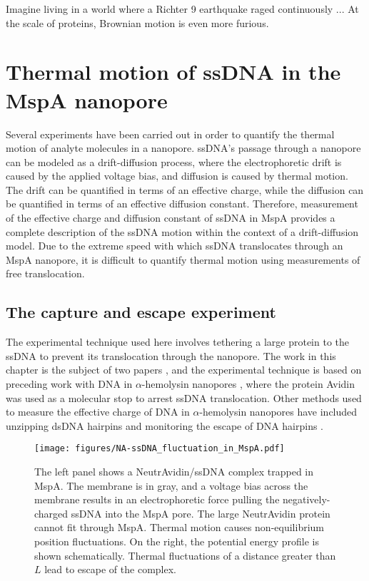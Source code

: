 \begin{savequote}[75mm]
Imagine living in a world where a Richter 9 earthquake raged continuously ... At the scale of proteins, Brownian motion is even more furious.
\end{savequote}

\chapter{Thermal motion of ssDNA in the MspA nanopore}
\label{dna_thermal_motion_mspa}

Several experiments have been carried out in order to quantify the thermal motion of analyte molecules in a nanopore.  ssDNA's passage through a nanopore can be modeled as a drift-diffusion process, where the electrophoretic drift is caused by the applied voltage bias, and diffusion is caused by thermal motion.  The drift can be quantified in terms of an effective charge, while the diffusion can be quantified in terms of an effective diffusion constant.  Therefore, measurement of the effective charge and diffusion constant of ssDNA in MspA provides a complete description of the ssDNA motion within the context of a drift-diffusion model.  Due to the extreme speed with which ssDNA translocates through an MspA nanopore, it is difficult to quantify thermal motion using measurements of free translocation.

\section{The capture and escape experiment}

The experimental technique used here involves tethering a large protein to the ssDNA to prevent its translocation through the nanopore.  The work in this chapter is the subject of two papers \citep{Lu2015,Fleming2017}, and the experimental technique is based on preceding work with DNA in $\alpha$-hemolysin nanopores \citep{Wiggin2008}, where the protein Avidin was used as a molecular stop to arrest ssDNA translocation.  Other methods used to measure the effective charge of DNA in $\alpha$-hemolysin nanopores have included unzipping dsDNA hairpins \citep{Sauer-Budge2003,Mathe2004,Lakatos2005} and monitoring the escape of DNA hairpins \citep{Wanunu2008,Lathrop2010}.

\begin{figure}[h]
\begin{centering}
\texttt{[image: figures/NA-ssDNA\_fluctuation\_in\_MspA.pdf]}
\caption[The idea of capture and escape]{The left panel shows a NeutrAvidin/ssDNA complex trapped in MspA.  The membrane is in gray, and a voltage bias across the membrane results in an electrophoretic force pulling the negatively-charged ssDNA into the MspA pore.  The large NeutrAvidin protein cannot fit through MspA.  Thermal motion causes non-equilibrium position fluctuations.  On the right, the potential energy profile is shown schematically.  Thermal fluctuations of a distance greater than $L$ lead to escape of the complex.}
\label{fig:capture_escape_idea}
\end{centering}
\end{figure}

